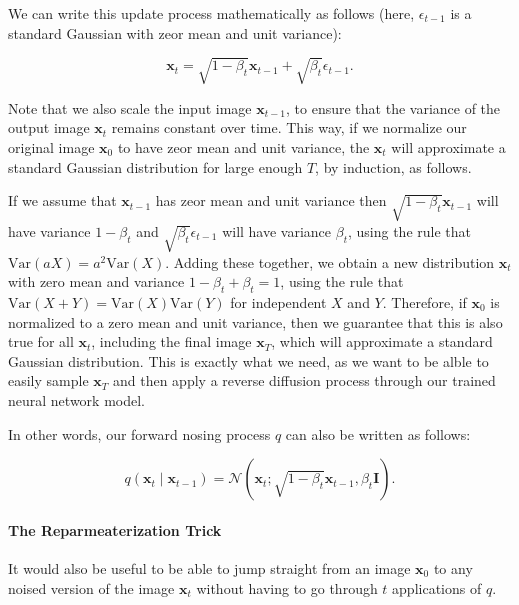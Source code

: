 We can write this update process mathematically as follows (here, \( \epsilon_{t-1} \) is a standard Gaussian with zeor mean and unit variance):

\[
    \mathbf{x}_t = \sqrt{1 - \beta_t}  \mathbf{x}_{t-1} + \sqrt{\beta_t} \epsilon_{t-1}
.\] 

Note that we also scale the input image \( \mathbf{x}_{t-1}\), to ensure that the variance of the output image \( \mathbf{x}_t \) remains constant over time. 
This way, if we normalize our original image \( \mathbf{x}_0 \) to have zeor mean and unit variance, the \( \mathbf{x}_t \) will approximate a standard Gaussian distribution for large enough \( T \), by induction, as follows.

If we assume that \( \mathbf{x}_{t-1} \) has zeor mean and unit variance then \( \sqrt{1 - \beta_t} \mathbf{x}_{t-1} \)  will have variance \( 1- \beta _t \) and \( \sqrt{\beta _t} \epsilon_{t-1}  \) will have variance \( \beta _t \), using the rule that \( \mathrm{Var}\left(aX\right) = a^2 \mathrm{Var}\left(X\right) \).
Adding these together, we obtain a new distribution \( \mathbf{x}_t \) with zero mean and variance \( 1- \beta _t + \beta _t =  1\), using the rule that \( \mathrm{Var}\left(X+Y\right) = \mathrm{Var}\left(X\right) \mathrm{Var}\left(Y\right)\) for independent \( X \) and \( Y \). 
Therefore, if \( \mathbf{x}_0 \) is normalized to a zero mean and unit variance, then we guarantee that this is also true for  all \( \mathbf{x}_t \), including the final image \( \mathbf{x}_T \), which will approximate a standard Gaussian distribution.
This is exactly what we need, as we want to be alble to easily sample \( \mathbf{x}_T \) and then apply a reverse diffusion process through our trained neural network model.

In other words, our forward nosing process \( q \) can also be written as follows:

\[
    q(\mathbf{x}_t  \mid  \mathbf{x}_{t-1}) = \mathcal{N}(\mathbf{x}_t; \sqrt{1- \beta _t} \mathbf{x}_{t-1}, \beta _t \mathbf{I}) 
.\] 

\paragraph{The Reparmeaterization Trick}

It would also be useful to be able to jump straight from an image \( \mathbf{x}_0 \) to any noised version of the image \(  \mathbf{x}_t\) without having to go through \( t \) applications of \( q \).


